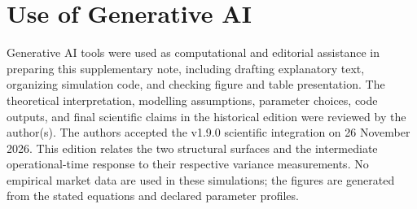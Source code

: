 \documentclass[11pt]{article}
\begin{document}
\section*{Use of Generative AI}

Generative AI tools were used as computational and editorial assistance in
preparing this supplementary note, including drafting explanatory text,
organizing simulation code, and checking figure and table presentation. The
theoretical interpretation, modelling assumptions, parameter choices, code
outputs, and final scientific claims in the historical edition were reviewed by the author(s). The authors accepted the v1.9.0 scientific integration on 26 November 2026. This edition relates the two structural surfaces and the intermediate operational-time response to their respective variance measurements. No empirical market data are used in
these simulations; the figures are generated from the stated equations and
declared parameter profiles.
\end{document}
